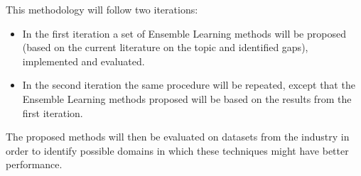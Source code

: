 This methodology will follow two iterations:

\begin{itemize}
	\item In the first iteration a set of Ensemble Learning methods will be proposed (based on the current literature on the topic and identified gaps), implemented and evaluated.
	\item In the second iteration the same procedure will be repeated, except that the Ensemble Learning methods proposed will be based on the results from the first iteration.
\end{itemize}

 

The proposed methods will then be evaluated on datasets from the industry in order to identify possible domains in which these techniques might have better performance.

